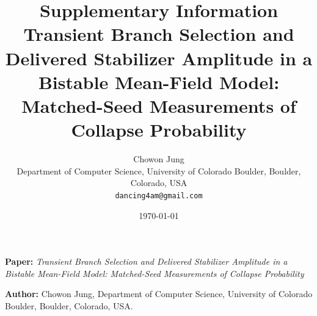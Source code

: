 \documentclass[11pt,letterpaper]{article}
\title{Supplementary Information \\ \large Transient Branch Selection and Delivered Stabilizer Amplitude in a Bistable Mean-Field Model:\\ Matched-Seed Measurements of Collapse Probability}
\author{Chowon Jung\\
Department of Computer Science, University of Colorado Boulder, Boulder, Colorado, USA\\
\small\texttt{dancing4am@gmail.com}}
\date{\today}
\begin{document}
\maketitle


\renewcommand{\thesection}{S\arabic{section}}
\renewcommand{\thesubsection}{S\arabic{section}.\arabic{subsection}}
\renewcommand{\thefigure}{S\arabic{figure}}
\renewcommand{\theequation}{S\arabic{equation}}
\setcounter{figure}{0}
\setcounter{section}{0}
\setcounter{equation}{0}

\textbf{Paper:} \emph{Transient Branch Selection and Delivered Stabilizer Amplitude in a Bistable Mean-Field Model: Matched-Seed Measurements of Collapse Probability}

\textbf{Author:} Chowon Jung, Department of Computer Science, University of Colorado Boulder, Boulder, Colorado, USA.
\end{document}
